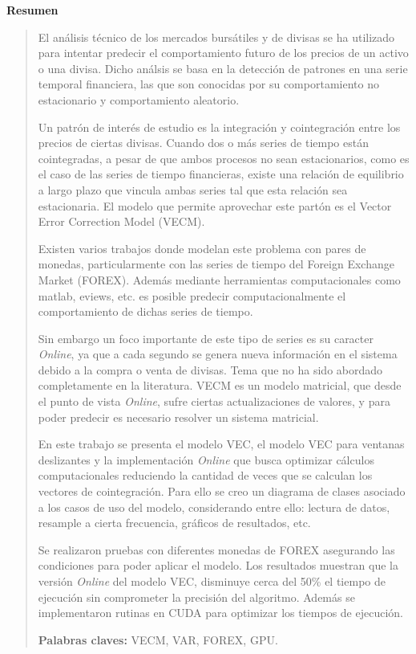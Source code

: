 \newpage

\vspace*{2cm}
\thispagestyle{empty}
{\bfseries \Huge Resumen }
\vspace{1.5cm}

\begin{quotation}
El análisis técnico de los mercados bursátiles y de divisas se ha utilizado
para intentar predecir el comportamiento futuro de los precios de un activo o
una divisa. Dicho análsis se basa en la detección de patrones en una serie
temporal financiera, las que son conocidas por su comportamiento no
estacionario y comportamiento aleatorio. 

Un patrón de interés de estudio es la integración y cointegración entre los
precios de ciertas divisas. Cuando dos o más series de tiempo están
cointegradas, a pesar de que ambos procesos no sean estacionarios, como es el
caso de las series de tiempo financieras, existe una relación de equilibrio a
largo plazo que vincula ambas series tal que esta relación sea estacionaria. El
modelo que permite aprovechar este partón es el Vector Error Correction Model
(VECM).

Existen varios trabajos donde modelan este problema con pares de monedas,
particularmente con las series de tiempo del Foreign Exchange Market (FOREX).
Además mediante herramientas computacionales como matlab, eviews, etc. es
posible predecir computacionalmente el comportamiento de dichas series de
tiempo.

Sin embargo un foco importante de este tipo de series es su caracter
\emph{Online}, ya que a cada segundo se genera nueva información en el sistema
debido a la compra o venta de divisas. Tema que no ha sido abordado
completamente en la literatura. VECM es un modelo matricial, que desde el punto
de vista \emph{Online}, sufre ciertas actualizaciones de valores, y para poder
predecir es necesario resolver un sistema matricial.

En este trabajo se presenta el modelo VEC, el modelo VEC para ventanas
deslizantes y la implementación \emph{Online} que busca optimizar cálculos
computacionales reduciendo la cantidad de veces que se calculan los vectores de
cointegración. Para ello se creo un diagrama de clases asociado a los casos de
uso del modelo, considerando entre ello: lectura de datos, resample a cierta
frecuencia, gráficos de resultados, etc.

Se realizaron pruebas con diferentes monedas de FOREX asegurando las
condiciones para poder aplicar el modelo. Los resultados muestran que la
versión \emph{Online} del modelo VEC, disminuye cerca del 50\% el tiempo de
ejecución sin comprometer la precisión del algoritmo. Además se implementaron
rutinas en CUDA para optimizar los tiempos de ejecución.

{\bf Palabras claves:} VECM, VAR, FOREX, GPU.

\end{quotation}
